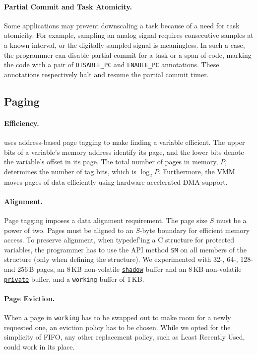  \paragraph{Partial Commit and Task Atomicity.}
 Some applications may prevent
downscaling a task because of a need for task atomicity.  For example, sampling
an analog signal requires consecutive samples at a known interval, or the
digitally sampled signal is meaningless.  In such a case, the programmer can
disable partial commit for a task or a span of code, marking  the code with a
pair of \texttt{DISABLE\_PC} and \texttt{ENABLE\_PC} annotations.
These annotations respectively halt and resume the partial commit timer.

\subsection{Paging}
\label{sec:impl:paging}


\paragraph{Efficiency.}
\sys uses address-based page tagging to make finding a variable efficient.  The
upper bits of a variable's memory address identify its page, and the lower bits
denote the variable's offset in its page. The total number of pages in memory,
$P$, determines the number of tag bits, which is $\log_2 P$.
%
Furthermore, the VMM moves pages of data efficiently using hardware-accelerated DMA support.

\paragraph{Alignment.}
Page tagging imposes a data alignment requirement.
The page size $S$ must be a power of two. 
%
Pages must be aligned to an $S$-byte boundary for efficient memory access. 
%
To preserve alignment, when typedef'ing a C structure for protected variables, the programmer has to use the API method \texttt{SM} on all members of the structure (only when defining the structure).
%
We experimented with 32-, 64-, 128- and 256\,B pages, an 8\,KB non-volatile \texttt{\underline{shadow}} buffer and
an 8\,KB non-volatile \texttt{\underline{private}} buffer, and a \texttt{working} buffer
of 1\,KB.

\paragraph{Page Eviction.}
When a page in \texttt{working} has to be swapped out to make room for a newly requested one, an eviction policy has to be chosen.
While we opted for the simplicity of FIFO, any other replacement policy, such as Least Recently Used, could work in its place.

